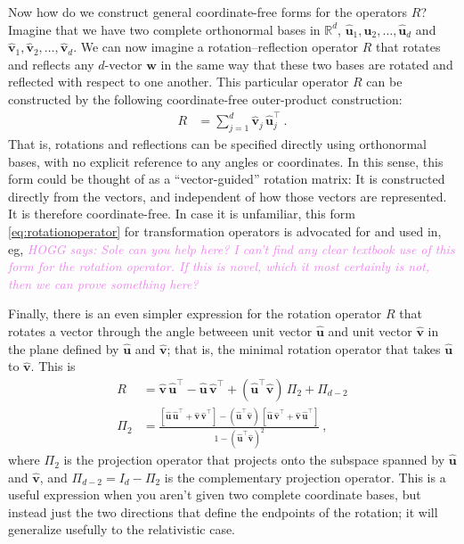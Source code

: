 \documentclass{article}
\newcommand{\proj}{\mathsf{\Pi}}
\newcommand{\Evec}[1]{{\mathbf{#1}}} %
\newcommand{\Ehat}[1]{{\mathbf{\hat{#1}}}} %
\newcommand{\HOGG}[1]{\textcolor{violet}{\textsl{HOGG says: {#1}}}}
\begin{document}
Now how do we construct general coordinate-free forms for the operators $R$?
Imagine that we have two complete orthonormal bases in $\mathbb{R}^d$, $\Ehat{u}_1,\Ehat{u}_2,\ldots,\Ehat{u}_d$ and $\Ehat{v}_1,\Ehat{v}_2,\ldots,\Ehat{v}_d$.
We can now imagine a rotation--reflection operator $R$ that rotates and reflects any $d$-vector $\Evec{w}$ in the same way that these two bases are rotated and reflected with respect to one another.
This particular operator $R$ can be constructed by the following coordinate-free outer-product construction:
\begin{align}
    R &= \sum_{j=1}^d \Ehat{v}_j\,\Ehat{u}_j^\top ~.\label{eq:rotationoperator}
\end{align}
That is, rotations and reflections can be specified directly using orthonormal bases, with no explicit reference to any angles or coordinates.
In this sense, this form could be thought of as a ``vector-guided'' rotation matrix:
It is constructed directly from the vectors, and independent of how those vectors are represented.
It is therefore coordinate-free.
In case it is unfamiliar, this form \eqref{eq:rotationoperator} for transformation operators is advocated for and used in, eg, \HOGG{Sole can you help here? I can't find any clear textbook use of this form for the rotation operator. If this is novel, which it most certainly is not, then we can prove something here?}

Finally, there is an even simpler expression for the rotation operator $R$ that rotates a vector through the angle betweeen unit vector $\Ehat{u}$ and unit vector $\Ehat{v}$ in the plane defined by $\Ehat{u}$ and $\Ehat{v}$; that is, the minimal rotation operator that takes $\Ehat{u}$ to $\Ehat{v}$.
This is
\begin{align}
    R &= \Ehat{v}\,\Ehat{u}^\top - \Ehat{u}\,\Ehat{v}^\top + (\Ehat{u}^\top\Ehat{v})\,\proj_{2} + \proj_{d-2} \label{eq:vecs2rot} \\
    \proj_2 &= \frac{[\Ehat{u}\,\Ehat{u}^\top + \Ehat{v}\,\Ehat{v}^\top] - (\Ehat{u}^\top\Ehat{v})\,[\Ehat{u}\,\Ehat{v}^\top + \Ehat{v}\,\Ehat{u}^\top]}{1 - (\Ehat{u}^\top\Ehat{v})^2} ~,
\end{align}
where $\proj_2$ is the projection operator that projects onto the subspace spanned by $\Ehat{u}$ and $\Ehat{v}$, and $\proj_{d-2} = I_d - \proj_2$ is the complementary projection operator.
This is a useful expression when you aren't given two complete coordinate bases, but instead just the two directions that define the endpoints of the rotation; it will generalize usefully to the relativistic case.
\end{document}
